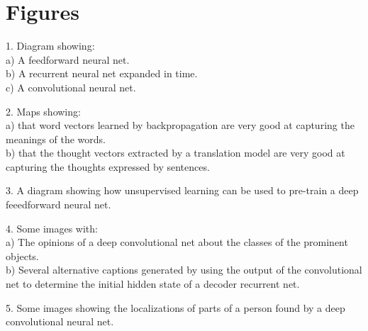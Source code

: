 \documentclass[]{article}
\begin{document}
\section{Figures}

1. Diagram showing:\\ a) A feedforward neural net.\\ b) A recurrent neural
net expanded in time.\\ c) A convolutional neural net.

2. Maps showing:\\ a) that word vectors learned by backpropagation are very
good at capturing the meanings of the words.\\ b) that the thought vectors
extracted by a translation model are very good at capturing the thoughts
expressed by sentences.

3. A diagram showing how unsupervised learning can be used to pre-train a
deep feeedforward neural net.

4. Some images with:\\ a) The opinions of a deep convolutional net about
the classes of the prominent objects.\\ b) Several alternative captions
generated by using the output of the convolutional net to determine the
initial hidden state of a decoder recurrent net.
 
5. Some images showing the localizations of parts of a person found by a
deep convolutional neural net.\\




\end{document}
